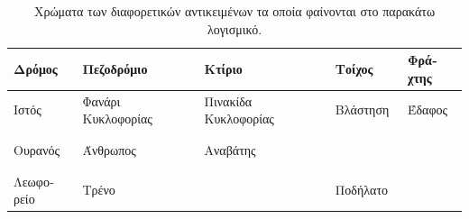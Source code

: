 \begin{table}[H]

\begin{tabular}{|l|l|l|l|l|}
\hline
 \cellcolor[HTML]{804080}\textgreek{Δρόμος} & \cellcolor[HTML]{F423E8}\textgreek{Πεζοδρόμιο} & \cellcolor[HTML]{464646}\textgreek{Κτίριο} & \cellcolor[HTML]{66669C}\textgreek{Τοίχος}& \cellcolor[HTML]{BE9999}\textgreek{Φράχτης}\\ \hline    

\cellcolor[HTML]{999999}\textgreek{Ιστός} & \cellcolor[HTML]{FAAA1E}\textgreek{Φανάρι Κυκλοφορίας} & \cellcolor[HTML]{DCDC00}\textgreek{Πινακίδα Κυκλοφορίας} & \cellcolor[HTML]{6B8E23}\textgreek{Βλάστηση}& \cellcolor[HTML]{98FB98}\textgreek{Έδαφος}\\ 

\cellcolor[HTML]{4682B4}\textgreek{Ουρανός} & \cellcolor[HTML]{DC143C}\textgreek{Άνθρωπος} & \cellcolor[HTML]{FF0000}\textgreek{Αναβάτης} & \cellcolor[HTML]{00008E}\textcolor{white}{\textgreek{Αυτοκίνητο}} & \cellcolor[HTML]{000046} \textcolor{white}{\textgreek{Φορτηγό}} \\

\cellcolor[HTML]{003C64}\textgreek{Λεωφορείο} & \cellcolor[HTML]{005064}\textgreek{Τρένο} & \cellcolor[HTML]{0000E6}\textcolor{white}{\textgreek{Μοτοσυκλέτα}} & \cellcolor[HTML]{770B20}\textgreek{Ποδήλατο} & \cellcolor[HTML]{000000}\textcolor{white}{\textgreek{Κενό}} \\ \hline

\end{tabular}
\caption[\textgreek{Πίνακας Χρωμάτων των Κλάσεων}]{\textgreek{Χρώματα των διαφορετικών αντικειμένων τα οποία φαίνονται στο παρακάτω λογισμικό. }}\label{tb:class_colors}
\end{table}





